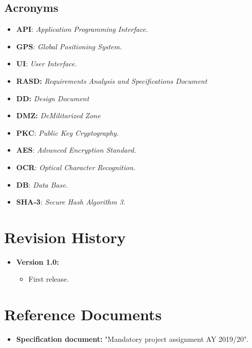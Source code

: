 \documentclass[12pt,a4paper]{report}
\begin{document}
			\subsection{Acronyms}
				\begin{itemize}
				\item \textbf{API}: \emph{Application Programming Interface.}
				\item \textbf{GPS}: \emph{Global Positioning System.}
				\item \textbf{UI}: \emph{User Interface.}
				\item \textbf{RASD:} \emph{Requirements Analysis and Specifications Document}
				\item \textbf{DD:} \emph{Design Document}
				\item \textbf{DMZ:} \emph{DeMilitarized Zone}
				\item \textbf{PKC}: \emph{Public Key Cryptography.}
				\item \textbf{AES}: \emph{Advanced Encryption Standard.}
				\item \textbf{OCR}: \emph{Optical Character Recognition.}
				\item \textbf{DB}: \emph{Data Base.}
				\item \textbf{SHA-3}: \emph{Secure Hash Algorithm 3.}
				\end{itemize}
		\section{Revision History}
			\begin{itemize}
				\item \textbf{Version 1.0:}
				\begin{itemize}
					\item First release.
				\end{itemize}
			\end {itemize}
		\section{Reference Documents}
			\begin{itemize}
				\item \textbf{Specification document:} "Mandatory project assignment AY 2019/20".
			\end{itemize}
\end{document}
